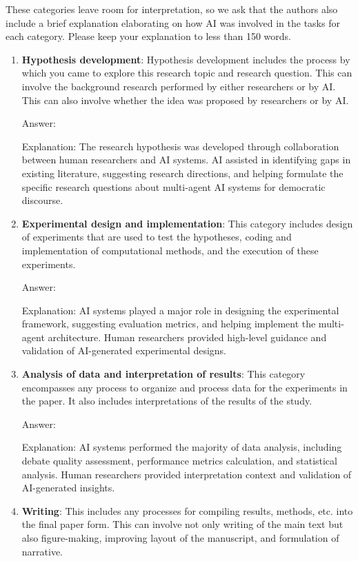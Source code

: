 \documentclass[11pt]{article}
\begin{document}
These categories leave room for interpretation, so we ask that the authors also include a brief explanation elaborating on how AI was involved in the tasks for each category. Please keep your explanation to less than 150 words.

\begin{enumerate}
    \item \textbf{Hypothesis development}: Hypothesis development includes the process by which you came to explore this research topic and research question. This can involve the background research performed by either researchers or by AI. This can also involve whether the idea was proposed by researchers or by AI.
  
    Answer: \involvementC{} 
     
    Explanation: The research hypothesis was developed through collaboration between human researchers and AI systems. AI assisted in identifying gaps in existing literature, suggesting research directions, and helping formulate the specific research questions about multi-agent AI systems for democratic discourse.
     
    \item \textbf{Experimental design and implementation}: This category includes design of experiments that are used to test the hypotheses, coding and implementation of computational methods, and the execution of these experiments.
  
    Answer: \involvementC{} 
     
    Explanation: AI systems played a major role in designing the experimental framework, suggesting evaluation metrics, and helping implement the multi-agent architecture. Human researchers provided high-level guidance and validation of AI-generated experimental designs.
     
    \item \textbf{Analysis of data and interpretation of results}: This category encompasses any process to organize and process data for the experiments in the paper. It also includes interpretations of the results of the study.
  
    Answer: \involvementC{} 
     
    Explanation: AI systems performed the majority of data analysis, including debate quality assessment, performance metrics calculation, and statistical analysis. Human researchers provided interpretation context and validation of AI-generated insights.
     
    \item \textbf{Writing}: This includes any processes for compiling results, methods, etc. into the final paper form. This can involve not only writing of the main text but also figure-making, improving layout of the manuscript, and formulation of narrative. 


\end{enumerate}
\end{document}
